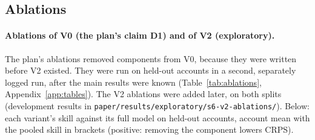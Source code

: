 \subsection{Ablations}
\label{app:ablations}
\paragraph{Ablations of V0 (the plan's claim D1) and of V2 (exploratory).}
The plan's ablations removed components from V0, because they were
written before V2 existed. They were run on held-out accounts in a second,
separately logged run, after the main results were known
(Table~\ref{tab:ablations}, Appendix~\ref{app:tables}). The V2 ablations
were added later, on both splits (development results in
\texttt{paper/results/exploratory/s6-v2-ablations/}). Below: each variant's
skill against its full model on held-out accounts, account mean with the
pooled skill in brackets (positive: removing the component lowers CRPS).

